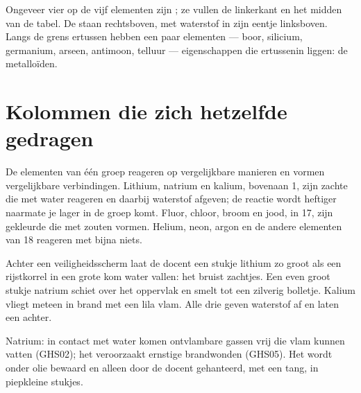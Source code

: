 \begin{proposition}\label{prop:g9:periodic-table-first-look:where}
Ongeveer vier op de vijf elementen zijn ; ze vullen de linkerkant
en het midden van de tabel. De  staan rechtsboven, met
waterstof in zijn eentje linksboven. Langs de grens ertussen hebben een
paar elementen --- boor, silicium, germanium, arseen, antimoon, telluur
--- eigenschappen die ertussenin liggen: de metalloïden.
\end{proposition}

\section{Kolommen die zich hetzelfde gedragen}

\begin{proposition}\label{prop:g9:periodic-table-first-look:alike}
De elementen van één groep reageren op vergelijkbare manieren en vormen
vergelijkbare verbindingen. Lithium, natrium en kalium, bovenaan  1,
zijn zachte  die met water reageren en daarbij waterstof afgeven;
de reactie wordt heftiger naarmate je lager in de groep komt. Fluor,
chloor, broom en jood, in  17, zijn gekleurde  die met
 zouten vormen. Helium, neon, argon en de andere elementen van
 18 reageren met bijna niets.
\end{proposition}

\begin{inthelab}
Achter een veiligheidsscherm laat de docent een stukje lithium zo groot
als een rijstkorrel in een grote kom water vallen: het bruist zachtjes.
Een even groot stukje natrium schiet over het oppervlak en smelt tot een
zilverig bolletje. Kalium vliegt meteen in brand met een lila vlam. Alle
drie geven waterstof af en laten een  achter.
\end{inthelab}

\begin{safety}{}
Natrium: in contact met water komen ontvlambare gassen vrij die vlam
kunnen vatten (GHS02); het veroorzaakt ernstige brandwonden (GHS05). Het
wordt onder olie bewaard en alleen door de docent gehanteerd, met een
tang, in piepkleine stukjes.
\end{safety}

